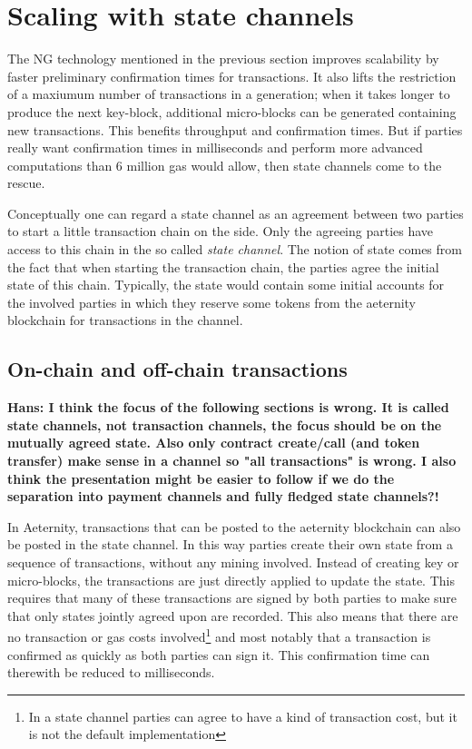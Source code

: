 \section{Scaling with state channels}
\label{sect:channels}

The NG technology mentioned in the previous section improves
scalability by faster preliminary confirmation times for
transactions. It also lifts the restriction of a maxiumum number of transactions in a
generation; when it takes longer to produce the next key-block,
additional micro-blocks can be generated containing new transactions.
This benefits throughput and confirmation times. But if parties really
want confirmation times in milliseconds and perform more advanced
computations than 6 million gas would allow, then state channels come to the rescue.

Conceptually one can regard a state channel as an agreement between
two parties to start a little transaction chain on the side. Only the
agreeing parties have access to this chain in the so called
\textit{state channel}. The notion of state comes from the fact that
when starting the transaction chain, the parties agree the initial
state of this chain. Typically, the state would
contain some initial accounts for the involved parties in which they
reserve some tokens from the aeternity blockchain for transactions in
the channel.

\subsection{On-chain and off-chain transactions}

\textbf{Hans: I think the focus of the following sections is wrong. It is called
state channels, not transaction channels, the focus should be on the
mutually agreed state. Also only contract create/call (and token transfer) make
sense in a channel so "all transactions" is wrong. I also think the presentation
might be easier to follow if we do the separation into payment channels and fully
fledged state channels?!}

In Aeternity, transactions that can be posted to the aeternity
blockchain can also be posted in the state channel. In this way parties
create their own state from a sequence of transactions, without any
mining involved. Instead of
creating key or micro-blocks, the transactions are just
directly applied to update the state. This requires that many of these
transactions are signed by both parties to make sure that only states
jointly agreed upon are recorded. This also
means that there are no transaction or gas costs involved\footnote{In a state
channel parties can agree to have a kind of transaction cost, but it
is not the default implementation} and most notably that a transaction
is confirmed as quickly as both parties can sign it. This confirmation
time can therewith be reduced to milliseconds.

